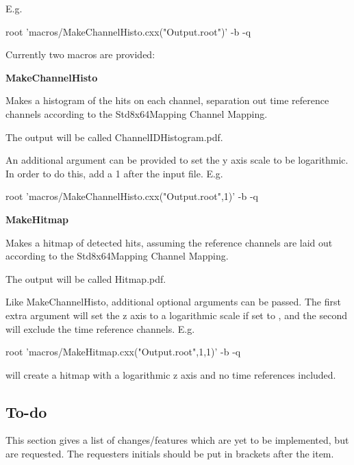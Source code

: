 E.\+g. 
\begin{DoxyCode}
root 'macros/MakeChannelHisto.cxx("Output.root")' -b -q
\end{DoxyCode}


Currently two macros are provided\+:


\begin{DoxyItemize}
\item {\bfseries Make\+Channel\+Histo}
\end{DoxyItemize}

Makes a histogram of the hits on each channel, separation out time reference channels according to the {\ttfamily Std8x64\+Mapping} Channel Mapping.

The output will be called {\ttfamily Channel\+I\+D\+Histogram.\+pdf}.

An additional argument can be provided to set the y axis scale to be logarithmic. In order to do this, add a 1 after the input file. E.\+g. 
\begin{DoxyCode}
root 'macros/MakeChannelHisto.cxx("Output.root",1)' -b -q
\end{DoxyCode}



\begin{DoxyItemize}
\item {\bfseries Make\+Hitmap}
\end{DoxyItemize}

Makes a hitmap of detected hits, assuming the reference channels are laid out according to the {\ttfamily Std8x64\+Mapping} Channel Mapping.

The output will be called {\ttfamily Hitmap.\+pdf}.

Like {\ttfamily Make\+Channel\+Histo}, additional optional arguments can be passed. The first extra argument will set the z axis to a logarithmic scale if set to {}, and the second will exclude the time reference channels. E.\+g. 
\begin{DoxyCode}
root 'macros/MakeHitmap.cxx("Output.root",1,1)' -b -q
\end{DoxyCode}
 will create a hitmap with a logarithmic z axis and no time references included.

\subsection*{To-\/do \label{_ToDo}%
}

This section gives a list of changes/features which are yet to be implemented, but are requested. The requester\textquotesingle{}s initials should be put in brackets after the item.


